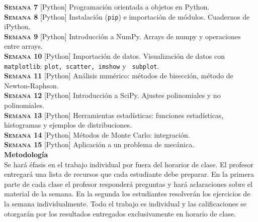 \documentclass[letterpaper,10pt,onecolumn]{article}
\begin{document}
\noindent\textbf{\textsc{Semana 7}} [Python] Programaci\'on orientada
a objetos en Python.\\[-0.3cm]  

\noindent\textbf{\textsc{Semana 8}} [Python] Instalación (\verb+pip+) e
importación de módulos. Cuadernos de iPython.\\[-0.3cm]  

\noindent\textbf{\textsc{Semana 9}} [Python] Introducción a
NumPy. Arrays de numpy y operaciones entre arrays. \\[-0.3cm]  

\noindent\textbf{\textsc{Semana 10}} [Python] Importación de datos. Visualización de datos con
\verb+matplotlib+: \verb+plot, scatter, imshow+ y  \verb+ subplot+.\\[-0.3cm]  

\noindent\textbf{\textsc{Semana 11}} [Python] Análisis numérico:
métodos de bisección, método de Newton-Raphson. \\[-0.3cm]  

\noindent\textbf{\textsc{Semana 12}} [Python] Introducción a
SciPy. Ajustes polinomiales y no polinomiales.\\[-0.3cm]  

\noindent\textbf{\textsc{Semana 13}} [Python] Herramientas
estadísticas: funciones estadísticas, histogramas y ejemplos de
distribuciones.\\[-0.3cm] 

\noindent\textbf{\textsc{Semana 14}} [Python] Métodos de Monte Carlo:
integración.\\[-0.3cm] 

\noindent\textbf{\textsc{Semana 15}} [Python] Aplicación a un problema de mecánica. \\[0.1cm] 

\noindent\textbf{\large {} \quad Metodología}\\[-0.2cm]

\noindent\normalsize Se har\'a \'efasis en el trabajo individual por
fuera del horarior de clase. El profesor entregar\'a una lista de
recursos que cada estudiante debe preparar. 
En la primera parte de cada clase el profesor responderá preguntas y hará aclaraciones sobre el material de la semana. En la segunda los estudiantes resolverán los ejercicios de la semana individualmente. 
Todo el trabajo es individual y las calificaciones se otorgar\'an por
los resultados entregados exclusivamente en horario de clase.
\\[0.1cm] 
\end{document}

